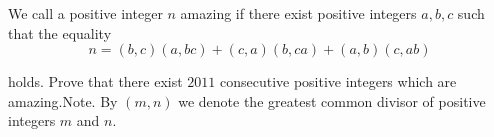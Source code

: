 We call a positive integer $n$ amazing if there exist positive integers $a, b, c$ such that the equality\[n = (b, c)(a, bc) + (c, a)(b, ca) + (a, b)(c, ab)\]

holds. Prove that there exist $2011$ consecutive positive integers which are amazing.Note. By $(m, n)$ we denote the greatest common divisor of positive integers $m$ and $n$.